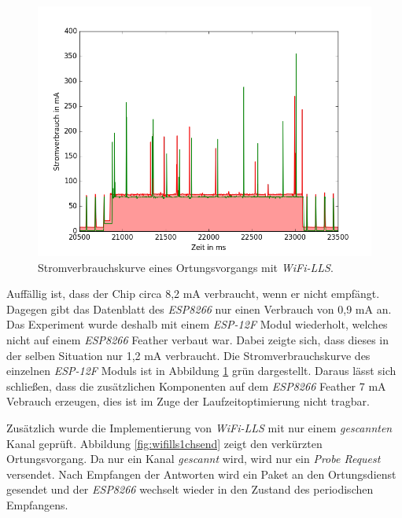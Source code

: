 \begin{figure}[h!]
  \centering
	\includegraphics[width=\textwidth]{plots/wifillssendv.png}
  \caption{Stromverbrauchskurve eines Ortungsvorgangs mit \emph{WiFi-LLS}.}
  \label{fig:wifillssendv}
\end{figure}

Auffällig ist, dass der Chip circa 8,2 mA verbraucht, wenn er nicht empfängt. 
Dagegen gibt das Datenblatt des \emph{ESP8266} nur einen Verbrauch von 0,9 mA an.
Das Experiment wurde deshalb mit einem \emph{ESP-12F} Modul wiederholt, welches nicht auf einem \emph{ESP8266} Feather verbaut war. 
Dabei zeigte sich, dass dieses in der selben Situation nur 1,2 mA verbraucht.
Die Stromverbrauchskurve des einzelnen \emph{ESP-12F} Moduls ist in Abbildung \ref{fig:wifillssendv} grün dargestellt.
Daraus lässt sich schließen, dass die zusätzlichen Komponenten auf dem \emph{ESP8266} Feather 7 mA Vebrauch erzeugen, dies ist im Zuge der Laufzeitoptimierung nicht tragbar.

Zusätzlich wurde die Implementierung von \emph{WiFi-LLS} mit nur einem \emph{gescannten} Kanal geprüft.
Abbildung \ref{fig:wifills1chsend} zeigt den verkürzten Ortungsvorgang.
Da nur ein Kanal \emph{gescannt} wird, wird nur ein \emph{Probe Request} versendet.
Nach Empfangen der Antworten wird ein Paket an den Ortungsdienst gesendet und der \emph{ESP8266} wechselt wieder in den Zustand des periodischen Empfangens.

